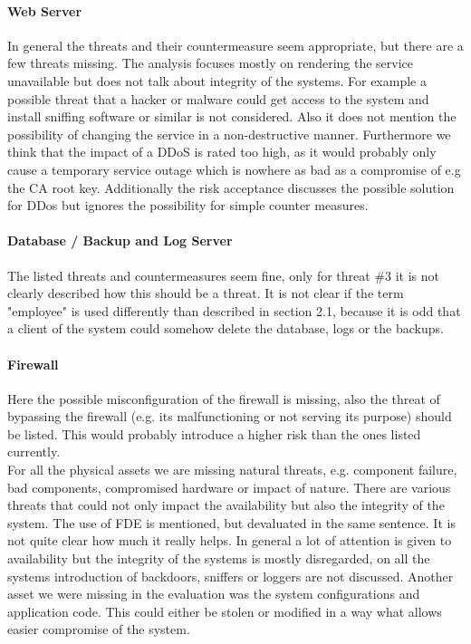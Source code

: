 \documentclass[english]{article}
\begin{document}
\paragraph{Web Server}
In general the threats and their countermeasure seem appropriate, but there are a few threats missing. The analysis focuses mostly on rendering the service unavailable but does not talk about integrity of the systems. For example a possible threat that a hacker or malware could get access to the system and install sniffing software or similar is not considered. Also it does not mention the possibility of changing the service in a non-destructive manner.
Furthermore we think that the impact of a DDoS is rated too high, as it would probably only cause a temporary service outage which is nowhere as bad as a compromise of e.g the CA root key. Additionally the risk acceptance discusses the possible solution for DDos but ignores the possibility for simple counter measures.

\paragraph{Database / Backup and Log Server}
The listed threats and countermeasures seem fine, only for threat \#3 it is not clearly described how this should be a threat. It is not clear if the term "employee" is used differently than described in section 2.1, because it is odd that a client of the system could somehow delete the database, logs or the backups.

\paragraph{Firewall}   
Here the possible misconfiguration of the firewall is missing, also the threat of bypassing the firewall (e.g. its malfunctioning or not serving its purpose) should be listed. This would probably introduce a higher risk than the ones listed currently.\\

For all the physical assets we are missing natural threats, e.g. component failure, bad components, compromised hardware or impact of nature. There are various threats that could not only impact the availability but also the integrity of the system. The use of FDE is mentioned, but devaluated in the same sentence. It is not quite clear how much it really helps. In general a lot of attention is given to availability but the integrity of the systems is mostly disregarded, on all the systems introduction of backdoors, sniffers or loggers are not discussed. Another asset we were missing in the evaluation was the system configurations and application code. This could either be stolen or modified in a way what allows easier compromise of the system. 
\end{document}
